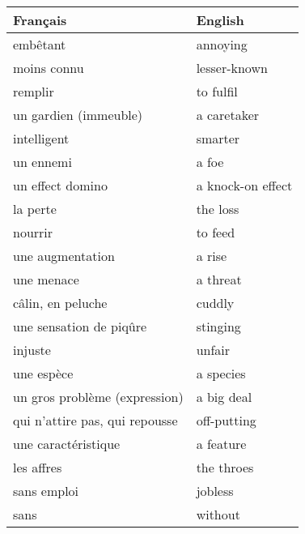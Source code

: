\documentclass[
  10pt,
]{article}
\begin{document}
\begin{longtable}{ll}
\toprule
Français &  English\\
\midrule
\rowcolor{gray!6}  embêtant & annoying\\

moins connu & lesser-known\\

\rowcolor{gray!6}  remplir & to fulfil\\

un gardien (immeuble) & a caretaker\\

\rowcolor{gray!6}  intelligent & smarter\\

un ennemi & a foe\\

\rowcolor{gray!6}  un effect domino & a knock-on effect\\

la perte & the loss\\

\rowcolor{gray!6}  nourrir & to feed\\

une augmentation & a rise\\

\rowcolor{gray!6}  une menace & a threat\\

câlin, en peluche & cuddly\\

\rowcolor{gray!6}  une sensation de piqûre & stinging\\

injuste & unfair\\

\rowcolor{gray!6}  une espèce & a \vphantom{1} species\\


un gros problème (expression) & a big deal\\

\rowcolor{gray!6}  qui n'attire pas, qui repousse & off-putting\\

une caractéristique & a feature\\

\rowcolor{gray!6}  les affres & the throes\\

sans emploi & jobless\\

\rowcolor{gray!6}  sans & without\\


\end{longtable}
\end{document}

